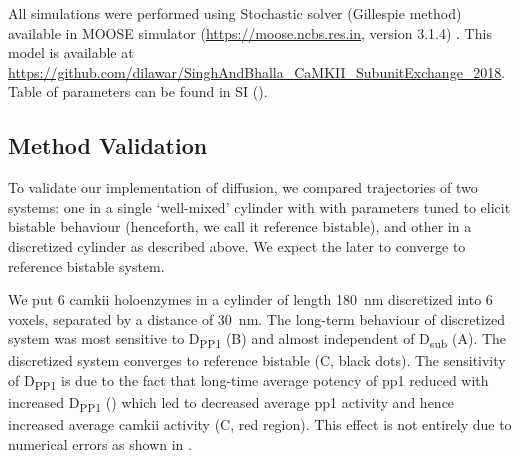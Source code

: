 \documentclass[9pt,lineno,doublespacing]{elife}
\newcommand\SUB[2]{#1\textsubscript{#2}}
\begin{document}
{All simulations were performed using Stochastic solver (Gillespie method)
available in MOOSE simulator (\url{https://moose.ncbs.res.in}, version 3.1.4)
\citep{ray_pymoose:_2008}. This model is available
at \url{https://github.com/dilawar/SinghAndBhalla_CaMKII_SubunitExchange_2018}.
Table of parameters can be found in SI ().

\subsection{Method Validation}

To validate our implementation of diffusion, we compared trajectories of two
systems: one in a single `well-mixed' cylinder with with parameters tuned to
elicit bistable behaviour (henceforth, we call it reference bistable), and other
in a discretized cylinder as described above. We expect the later to converge to
reference bistable system. 

We put 6 \gls{camkii} holoenzymes in a cylinder of length \SI{180}{\nano\meter}
discretized into 6 voxels, separated by a distance of \SI{30}{\nano\meter}. The
long-term behaviour of discretized system was most sensitive to \SUB{D}{PP1}
(B) and almost independent of \SUB{D}{sub}
(A). The discretized system converges to reference
bistable (C, black dots). The sensitivity of \SUB{D}{PP1}
is due to the fact that long-time average potency of \gls{pp1} reduced with
increased \SUB{D}{PP1}
() which led to
decreased average \gls{pp1} activity and hence increased average \gls{camkii}
activity (C, red region). This effect is not entirely due
to numerical errors as shown in . 

}
\end{document}

